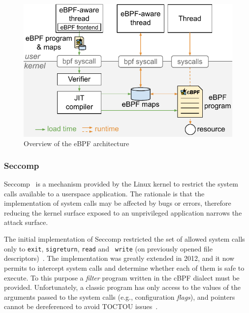 \begin{figure}[t]
  \centering
  \includegraphics[width=0.9\columnwidth]{chapters/natisand/fig/bpf_bg}
  \caption{Overview of the eBPF architecture}
  \label{fig:bpf_sandbox}
\end{figure}

\subsubsection*{Seccomp}

Seccomp~\cite{seccompbpf} is a mechanism
provided by the Linux kernel to restrict the system calls
available to a userspace application. The rationale is that the
implementation of system calls may be affected by bugs or errors,
therefore reducing the kernel surface exposed to an unprivileged
application narrows the attack surface.

The initial implementation of Seccomp restricted the set of allowed
system calls only to {\tt exit}, {\tt sigreturn}, {\tt read} and {\tt
  write} (on previously opened file
descriptors)~\cite{edge2015seccomp}. The implementation was greatly
extended in 2012, and it now permits to intercept system calls and
determine whether each of them is safe to execute.
To this purpose a {\em filter} program written in the cBPF
dialect must be provided. Unfortunately, a classic program has only
access to the values of the arguments passed to the system calls
(e.g., configuration {\em flags}), and pointers cannot be dereferenced
to avoid TOCTOU issues~\cite{seccomp-toctou}.


